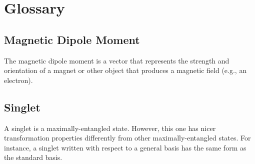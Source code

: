 \documentclass{article}
\begin{document}
\section{Glossary}
\subsection{Magnetic Dipole Moment}
The magnetic dipole moment is a vector that represents the strength and orientation of a magnet or other object that produces a magnetic field (e.g., an electron).

\subsection{Singlet}
A singlet is a maximally-entangled state. However, this one has nicer transformation properties differently from other maximally-entangled states. For instance, a singlet written with respect to a general basis has the same form as the standard basis.
\end{document}
